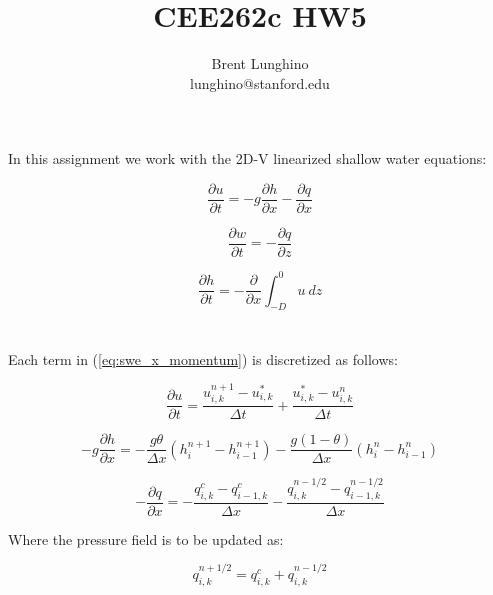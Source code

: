 \documentclass[12pt]{article}
\title{CEE262c HW5}
\author{Brent Lunghino\\lunghino@stanford.edu}
\begin{document}
    
\maketitle

In this assignment we work with the 2D-V linearized shallow water equations:

\begin{equation} \label{eq:swe_x_momentum}
\frac{\partial u}{\partial t} = -g \frac{\partial h}{\partial x} - \frac{\partial q}{\partial x}
\end{equation}

\begin{equation} \label{eq:swe_z_momentum}
\frac{\partial w}{\partial t} = -\frac{\partial q}{\partial z}
\end{equation}

\begin{equation} \label{eq:swe_continuity}
\frac{\partial h}{\partial t} = -\frac{\partial}{\partial x} \int_{-D}^{0} u~ dz
\end{equation}

\section{}

Each term in (\ref{eq:swe_x_momentum}) is discretized as follows:

\begin{equation*}
\frac{\partial u}{\partial t} = \frac{u_{i,k}^{n+1} - u_{i,k}^*}{\Delta t} + \frac{u_{i,k}^* - u_{i,k}^n}{\Delta t}
\end{equation*}

\begin{equation*}
-g \frac{\partial h}{\partial x} = - \frac{g \theta}{\Delta x} (h_{i}^{n+1}-h_{i-1}^{n+1}) - \frac{g (1-\theta)}{\Delta x} (h_{i}^n - h_{i-1}^n)
\end{equation*} 

\begin{equation*}
- \frac{\partial q}{\partial x} = -\frac{q_{i,k}^c - q_{i-1,k}^c}{\Delta x} - \frac{q_{i,k}^{n-1/2} - q_{i-1,k}^{n-1/2}}{\Delta x}
\end{equation*}

Where the pressure field is to be updated as:

\begin{equation*} \label{eq:pressure_update}
q_{i,k}^{n+1/2} = q_{i,k}^c + q_{i,k}^{n-1/2}
\end{equation*}
\end{document}
